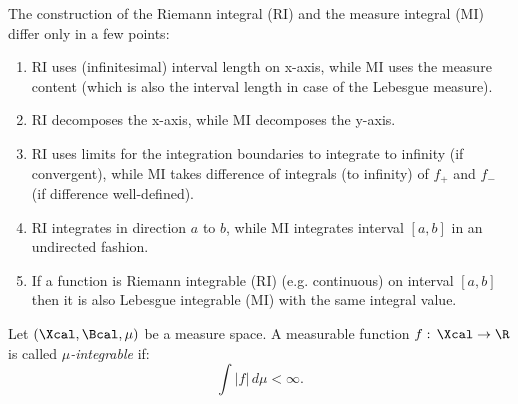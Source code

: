 \begin{Rem}
    The construction of the Riemann integral (RI) and the measure integral (MI) differ only in a few points:
    \begin{enumerate}
        \item RI uses (infinitesimal) interval length on x-axis, while MI uses the measure content
            (which is also the interval length in case of the Lebesgue measure).
        \item RI decomposes the x-axis, while MI decomposes the y-axis.
        \item RI uses limits for the integration boundaries to integrate to infinity (if convergent), 
                while MI takes difference of integrals (to infinity) of $f_+$ and $f_-$ (if difference well-defined).
        \item RI integrates in direction $a$ to $b$, while MI integrates interval $[a,b]$ in an undirected fashion.
        \item If a function is Riemann integrable (RI) (e.g. continuous) on interval $[a,b]$ 
            then it is also Lebesgue integrable (MI) with the same integral value.
    \end{enumerate}
\end{Rem}

\begin{Def}
   Let $(\Xcal,\Bcal,\mu)$ be a measure space. A measurable function $f:\,\Xcal \to \R$ is called \emph{$\mu$-integrable} if:
    \[  \int |f|\, d\mu < \infty.\]
\end{Def}

